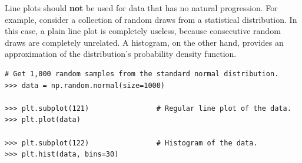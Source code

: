 \begin{warn} %
Line plots should \textbf{not} be used for data that has no natural progression.
For example, consider a collection of random draws from a statistical distribution.
In this case, a plain line plot is completely useless, because consecutive random draws are completely unrelated.
A histogram, on the other hand, provides an approximation of the distribution's probability density function.

\begin{lstlisting}
# Get 1,000 random samples from the standard normal distribution.
>>> data = np.random.normal(size=1000)

>>> plt.subplot(121)                # Regular line plot of the data.
>>> plt.plot(data)

>>> plt.subplot(122)                # Histogram of the data.
>>> plt.hist(data, bins=30)
\end{lstlisting}


\end{warn}
